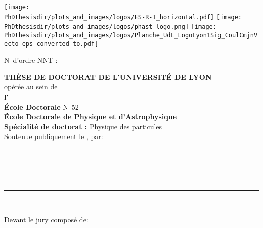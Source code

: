 \thispagestyle{empty}
\begin{center}
\large

\texttt{[image: \\PhDthesisdir/plots\_and\_images/logos/ES-R-I\_horizontal.pdf]}
\hfill
\texttt{[image: \\PhDthesisdir/plots\_and\_images/logos/phast-logo.png]}
\hfill
\texttt{[image: \\PhDthesisdir/plots\_and\_images/logos/Planche\_UdL\_LogoLyon1Sig\_CoulCmjnVecto-eps-converted-to.pdf]}

\vspace{1cm}

\begin{flushleft}
N\degree\ d'ordre NNT : \NordreNNT%
\end{flushleft}
\vspace{\baselineskip}
\large{\textbf{THÈSE DE DOCTORAT DE L’UNIVERSITÉ DE LYON}}\\
opérée au sein de\\
\textbf{l'\insertinstitute}\\
\vspace{\baselineskip}
\textbf{École Doctorale} N\degree\ 52\\
\textbf{École Doctorale de Physique et d'Astrophysique}\\
\vspace{\baselineskip}
\textbf{Spécialité de doctorat :} Physique des particules\\
\vspace{\baselineskip}
\vspace{\baselineskip}
\vspace{\baselineskip}
Soutenue publiquement le \insertdate, par:

\vspace{.25cm}

{\Large\textbf{\insertauthor}}\\
\vspace{\baselineskip}
\vspace{\baselineskip}
\rule{\linewidth}{.5pt}\\
\vspace{\baselineskip}
{\LARGE\textbf{\inserttitle}}
\vspace{.5\baselineskip}

\rule{\linewidth}{.5pt}\\
\vspace{\baselineskip}
\vspace{\baselineskip}
\begin{flushleft}
    Devant le jury composé de:
\end{flushleft}


\end{center}
